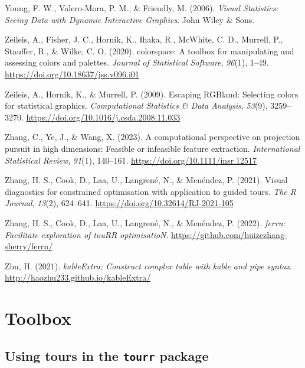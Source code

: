\documentclass[
  letterpaper,
]{krantz}
\newlength{\cslhangindent}
\newenvironment{CSLReferences}[2] %
 {\begin{list}{}{%
  \setlength{\itemindent}{0pt}
  \setlength{\leftmargin}{0pt}
  \setlength{\parsep}{0pt}
  \ifodd #1
   \setlength{\leftmargin}{\cslhangindent}
   \setlength{\itemindent}{-1\cslhangindent}
  \fi
  \setlength{\itemsep}{#2\baselineskip}}}
 {\end{list}}
\begin{document}
\begin{CSLReferences}{1}{0}
Young, F. W., Valero-Mora, P. M., \& Friendly, M. (2006). \emph{Visual
{S}tatistics: {S}eeing {D}ata with {D}ynamic {I}nteractive {G}raphics}.
John Wiley \& Sons.

Zeileis, A., Fisher, J. C., Hornik, K., Ihaka, R., McWhite, C. D.,
Murrell, P., Stauffer, R., \& Wilke, C. O. (2020). {colorspace}: A
toolbox for manipulating and assessing colors and palettes.
\emph{Journal of Statistical Software}, \emph{96}(1), 1--49.
\url{https://doi.org/10.18637/jss.v096.i01}

Zeileis, A., Hornik, K., \& Murrell, P. (2009). Escaping {RGB}land:
Selecting colors for statistical graphics. \emph{Computational
Statistics \& Data Analysis}, \emph{53}(9), 3259--3270.
\url{https://doi.org/10.1016/j.csda.2008.11.033}

Zhang, C., Ye, J., \& Wang, X. (2023). A computational perspective on
projection pursuit in high dimensions: Feasible or infeasible feature
extraction. \emph{International Statistical Review}, \emph{91}(1),
140--161. \url{https://doi.org/10.1111/insr.12517}

Zhang, H. S., Cook, D., Laa, U., Langrené, N., \& Menéndez, P. (2021).
Visual diagnostics for constrained optimisation with application to
guided tours. \emph{The R Journal}, \emph{13}(2), 624--641.
\url{https://doi.org/10.32614/RJ-2021-105}

Zhang, H. S., Cook, D., Laa, U., Langrené, N., \& Menéndez, P. (2022).
\emph{{ferrn}: Facilitate exploration of touRR optimisatioN}.
\url{https://github.com/huizezhang-sherry/ferrn/}

Zhu, H. (2021). \emph{{kableExtra}: Construct complex table with kable
and pipe syntax}. \url{http://haozhu233.github.io/kableExtra/}

\end{CSLReferences}

\cleardoublepage
{}
{}
\appendix

\chapter{Toolbox}\label{sec-toolbox}

\section{\texorpdfstring{Using tours in the \texttt{tourr}
package}{Using tours in the tourr package}}\label{using-tours-in-the-tourr-package}
\end{document}
